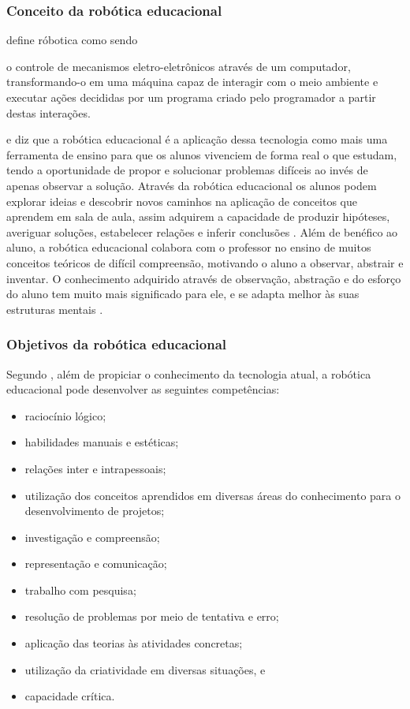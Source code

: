 \subsubsection{Conceito da robótica educacional}
\cite{maisonnette2002utilizaccao} define róbotica como sendo
\begin{citacao}
o controle de mecanismos eletro-eletrônicos através de um computador, 
transformando-o em uma máquina capaz de interagir com o meio ambiente e executar 
ações decididas por um programa criado pelo programador a partir destas interações. 
\end{citacao}
e diz que a robótica educacional é a aplicação dessa tecnologia como mais uma ferramenta de ensino para que os alunos vivenciem de forma real o que estudam, tendo a oportunidade de propor e solucionar problemas difíceis ao invés de apenas observar a solução.
Através da robótica educacional os alunos podem explorar ideias e descobrir novos caminhos na aplicação de conceitos que aprendem em sala de aula, assim adquirem a capacidade de produzir hipóteses, averiguar soluções, estabelecer relações e inferir conclusões \cite{benitti2009experimentaccao}.
Além de benéfico ao aluno, a robótica educacional colabora com o professor no ensino de muitos conceitos teóricos de difícil compreensão, motivando o aluno a observar, abstrair e inventar. O conhecimento adquirido através de observação, abstração e do esforço do aluno tem muito mais significado para ele, e se adapta melhor às suas estruturas mentais \cite{zilli2004robotica}.

\subsubsection{Objetivos da robótica educacional}
Segundo \cite{zilli2004robotica}, além de propiciar o conhecimento da tecnologia atual, a robótica educacional pode desenvolver as seguintes competências:
\begin{itemize}
\item raciocínio lógico;
\item habilidades manuais e estéticas;
\item relações inter e intrapessoais;
\item utilização dos conceitos aprendidos em diversas áreas do conhecimento para o desenvolvimento de projetos;
\item investigação e compreensão;
\item representação e comunicação;
\item trabalho com pesquisa;
\item resolução de problemas por meio de tentativa e erro;
\item aplicação das teorias às atividades concretas;
\item utilização da criatividade em diversas situações, e
\item capacidade crítica.
\end{itemize}

